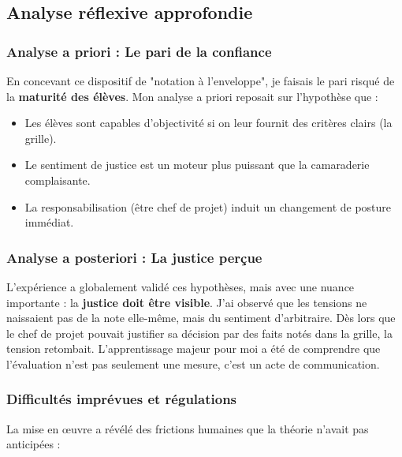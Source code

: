 \subsection{Analyse réflexive approfondie}

\subsubsection{Analyse a priori : Le pari de la confiance}
En concevant ce dispositif de "notation à l'enveloppe", je faisais le pari risqué de la \textbf{maturité des élèves}. Mon analyse a priori reposait sur l'hypothèse que :
\begin{itemize}
    \item Les élèves sont capables d'objectivité si on leur fournit des critères clairs (la grille).
    \item Le sentiment de justice est un moteur plus puissant que la camaraderie complaisante.
    \item La responsabilisation (être chef de projet) induit un changement de posture immédiat.
\end{itemize}

\subsubsection{Analyse a posteriori : La justice perçue}
L'expérience a globalement validé ces hypothèses, mais avec une nuance importante : la \textbf{justice doit être visible}. J'ai observé que les tensions ne naissaient pas de la note elle-même, mais du sentiment d'arbitraire. Dès lors que le chef de projet pouvait justifier sa décision par des faits notés dans la grille, la tension retombait. L'apprentissage majeur pour moi a été de comprendre que l'évaluation n'est pas seulement une mesure, c'est un acte de communication.

\subsubsection{Difficultés imprévues et régulations}
La mise en œuvre a révélé des frictions humaines que la théorie n'avait pas anticipées :

